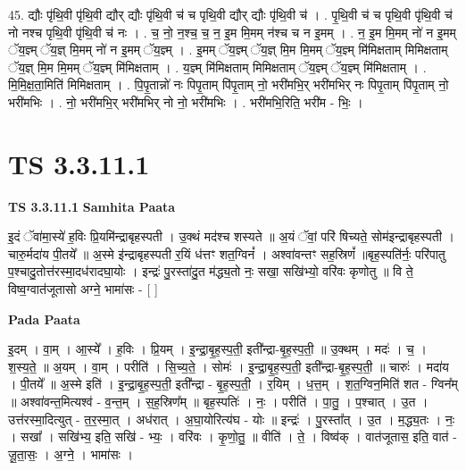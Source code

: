 \documentclass[17pt]{extarticle}
\begin{document}
45. द्यौः पृ॑थि॒वी पृ॑थि॒वी द्यौर् द्यौः पृ॑थि॒वी च॑ च पृथि॒वी द्यौर् द्यौः पृ॑थि॒वी च॑ । . पृ॒थि॒वी च॑ च पृथि॒वी पृ॑थि॒वी च॑ नो नश्च पृथि॒वी पृ॑थि॒वी च॑ नः । . च॒ नो॒ न॒श्च॒ च॒ न॒ इ॒म मि॒मम् न॑श्च च न इ॒मम् । . न॒ इ॒म मि॒मम् नो॑ न इ॒मम् ॅय॒ज्ञ्म् ॅय॒ज्ञ् मि॒मम् नो॑ न इ॒मम् ॅय॒ज्ञ्म् । . इ॒मम् ॅय॒ज्ञ्म् ॅय॒ज्ञ् मि॒म मि॒मम् ॅय॒ज्ञ्म् मि॑मिक्षताम् मिमिक्षताम् ॅय॒ज्ञ् मि॒म मि॒मम् ॅय॒ज्ञ्म् मि॑मिक्षताम् । . य॒ज्ञ्म् मि॑मिक्षताम् मिमिक्षताम् ॅय॒ज्ञ्म् ॅय॒ज्ञ्म् मि॑मिक्षताम् । . मि॒मि॒क्ष॒ता॒मिति॑ मिमिक्षताम् । . पि॒पृ॒तान्नो॑ नः पिपृ॒ताम् पि॑पृ॒ताम् नो॒ भरी॑मभि॒र् भरी॑मभिर् नः पिपृ॒ताम् पि॑पृ॒ताम् नो॒ भरी॑मभिः । . नो॒ भरी॑मभि॒र् भरी॑मभिर् नो नो॒ भरी॑मभिः । . भरी॑मभि॒रिति॒ भरी॑म - भिः॒ । \newline
\pagebreak
{}

\section{ TS 3.3.11.1 }

\textbf{TS 3.3.11.1 } \newline
\textbf{Samhita Paata} \newline

इ॒दं ॅवा॑मा॒स्ये॑ ह॒विः प्रि॒यमि॑न्द्राबृहस्पती । उ॒क्थं मद॑श्च शस्यते ॥ अ॒यं ॅवां॒ परि॑ षिच्यते॒ सोम॑इन्द्राबृहस्पती । चारु॒र्मदा॑य पी॒तये᳚ ॥ अ॒स्मे इ॑न्द्राबृहस्पती र॒यिं ध॑त्तꣳ शत॒ग्विनं᳚ । अश्वा॑वन्तꣳ सह॒स्रिणं᳚ ॥बृह॒स्पति॑र्नः॒ परि॑पातु प॒श्चादु॒तोत्त॑रस्मा॒दध॑रादघा॒योः । इन्द्रः॑ पु॒रस्ता॑दु॒त म॑द्ध्य॒तो नः॒ सखा॒ सखि॑भ्यो॒ वरि॑वः कृणोतु ॥ वि ते॒ विष्व॒ग्वात॑जूतासो अग्ने॒ भामा॑सः - [  ] \newline

\textbf{Pada Paata} \newline

इ॒दम् । वा॒म् । आ॒स्ये᳚ । ह॒विः । प्रि॒यम् । इ॒न्द्रा॒बृ॒ह॒स्प॒ती॒ इती᳚न्द्रा-बृ॒ह॒स्प॒ती॒ ॥ उ॒क्थम् । मदः॑ । च॒ । श॒स्य॒ते॒ ॥ अ॒यम् । वा॒म् । परीति॑ । सि॒च्य॒ते॒ । सोमः॑ । इ॒न्द्रा॒बृ॒ह॒स्प॒ती॒ इती᳚न्द्रा-बृ॒ह॒स्प॒ती॒ ॥ चारुः॑ । मदा॑य । पी॒तये᳚ ॥ अ॒स्मे इति॑ । इ॒न्द्रा॒बृ॒ह॒स्प॒ती॒ इती᳚न्द्रा - बृ॒ह॒स्प॒ती॒ । र॒यिम् । ध॒त्त॒म् । श॒त॒ग्विन॒मिति॑ शत - ग्विन᳚म् ॥ अश्वा॑वन्त॒मित्यश्व॑ - व॒न्त॒म् । स॒ह॒स्रिण᳚म् ॥ बृह॒स्पतिः॑ । नः॒ । परीति॑ । पा॒तु॒ । प॒श्चात् । उ॒त । उत्त॑रस्मा॒दित्युत् - त॒र॒स्मा॒त् । अध॑रात् । अ॒घा॒योरित्य॑घ - योः ॥ इन्द्रः॑ । पु॒रस्ता᳚त् । उ॒त । म॒द्ध्य॒तः । नः॒ । सखा᳚ । सखि॑भ्य॒ इति॒ सखि॑ - भ्यः॒ । वरि॑वः । कृ॒णो॒तु॒ ॥ वीति॑ । ते॒ । विष्व॑क् । वात॑जूतास॒ इति॒ वात॑ - जू॒ता॒सः॒ । अ॒ग्ने॒ । भामा॑सः ।  \newline
\end{document}
